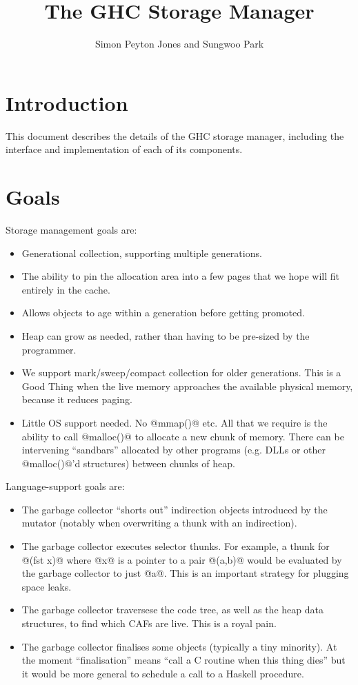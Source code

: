 \documentclass{article}
\begin{document}
\title{The GHC Storage Manager}
\author{Simon Peyton Jones and Sungwoo Park}

\makeatactive
\maketitle
\section{Introduction}

This document describes the details of the GHC storage manager, including
the interface and implementation of each of its components.

\section{Goals}

Storage management goals are:
\begin{itemize}
\item Generational collection, supporting multiple generations.
\item The ability to pin the allocation
area into a few pages that we hope will fit entirely in the cache.
\item Allows objects to age within a generation before getting promoted.
\item Heap can grow as needed, rather than having to be pre-sized
  by the programmer.
\item We support mark/sweep/compact collection for older generations.
This is a Good Thing when the live memory approaches the available
physical memory, because it reduces paging.
\item Little OS support needed.  No @mmap()@ etc. All that we require is
  the ability to call @malloc()@ to allocate a new chunk of memory.
  There can be intervening ``sandbars'' allocated by other programs
  (e.g. DLLs or other @malloc()@'d structures) between chunks of heap.
\end{itemize}

Language-support goals are:
\begin{itemize}
\item The garbage collector ``shorts out'' indirection objects introduced
by the mutator (notably when overwriting a thunk with an indirection).
\item The garbage collector executes selector thunks.
For example, a thunk for
@(fst x)@ where @x@ is a pointer to a pair @(a,b)@ would be
evaluated by the garbage collector to just @a@.  This is an important
strategy for plugging space leaks.
\item The garbage collector traversese the code tree, as well as
the heap data structures, to find which CAFs are live. This is a royal pain.
\item The garbage collector finalises some objects (typically a tiny minority).
At the moment ``finalisation'' means ``call a C routine when this thing
dies'' but it would be more general to schedule a call to a Haskell
procedure.
\end{itemize}
\end{document}
